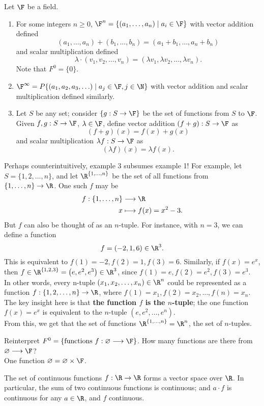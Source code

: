 \documentclass[math0540-lecture-notes.tex]{subfiles}
\begin{document}
\begin{example}
  Let $\F$ be a field.
  \begin{enumerate}
    \item For some integers $n\ge 0$, $\F^{n}=\{\left( a_1,\ldots,a_n \right) \mid a_i\in \F \} $
      with vector addition defined \[
        (a_1,\ldots,a_n)+(b_1,\ldots,b_n) = (a_1+b_1,\ldots,a_n+b_n)
      \] and scalar multiplication defined \[
      \lambda\cdot (v_1,v_2,\ldots,v_n) = (\lambda v_1,\lambda v_2,\ldots,\lambda v_n)
      .\] 
      Note that $ F^{0}=\{ 0 \}$.
    \item $\F^{\infty}=P\{ \left( a_1,a_2,a_3,\ldots \right)\mid a_j\in \F, j\in \N  \}$ with vector
      addition and scalar multiplication defined similarly.
    \item Let $S$ be any set; consider $\{ g:S\to\F \}$ be the set of functions from $S$ to $\F$.
      Given $f,g:S\to \F$, $\lambda\in \F$, define vector addition $(f+g):S\to\F$ as \[
        (f+g)(x) = f(x) + g(x)
      \] and scalar multiplication $ \lambda f:S\to\F$ as \[
      (\lambda f)(x) = \lambda f(x)
      .\] 
  \end{enumerate}
\end{example}
Perhaps counterintuitively, example 3 subsumes example 1! For example, let $S=\{1,2,\ldots,n\}$, and
let $\R^{\{ 1,\ldots,n \}}$ be the set of all functions from $\{ 1,\ldots,n \}\to \R$. One such $f$
may be \begin{align*}
  f: \{ 1,\ldots,n \} &\longrightarrow \R \\
  x &\longmapsto f(x) = x^2-3
.\end{align*} But $f$ can also be thought of as an $n$-tuple. For instance, with $n=3$, we can
define a function \[
  f = (-2,1,6)\in \R^3
.\] This is equivalent to $f(1)=-2,f(2)=1,f(3)=6$. Similarly, if $f(x) =e^{x}$, then $f\in \R^{\{
1,2,3 \}}=\left( e,e^2,e^3 \right) \in \R^3$, since $f(1)=e, f(2)=e^2,f(3)=e^3$. \\

In other words, every n-tuple $\left( x_1,x_2,\ldots,x_n \right) \in \R^n $ could be represented as a
function $f:\{ 1,2,\ldots,n \}\to\R$, where $f(1)=x_1,f(2)=x_2,\ldots,f(n)=x_n$. The key insight here is that
\textbf{the function $f$ is the $n$-tuple}; the one function $f(x)=e^{x}$ is equivalent to the
$n$-tuple $\left( e,e^2,\ldots,e^{n} \right) $.\\

From this, we get that the set of functions $\R^{\{ 1,\ldots,n \}}=\R^{n}$, the set of $n$-tuples.
\begin{remark}
  Reinterpret $F^{0}=\{\text{functions}~ f:\varnothing\longrightarrow \F \}$. How many functions
  are there from $\varnothing\longrightarrow \F$?\\
  One function $\varnothing=\varnothing\times \F$.
\end{remark}

\begin{example}
  The set of continuous functions $f: \R \to \R$ forms a vector space over $\R$. In particular, the
  sum of two continuous functions is continuous; and $a\cdot f$ is continuous for any $a\in \R$, and
  $f$ continuous.
\end{example}
\end{document}
